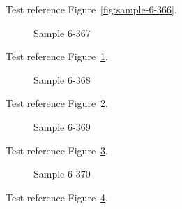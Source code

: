 Test reference Figure~\ref{fig:sample-6-366}.

\begin{figure}[tbhp]
\caption{Sample 6-367}
\label{fig:sample-6-367}
\end{figure}

Test reference Figure~\ref{fig:sample-6-367}.

\begin{figure}[tbhp]
\caption{Sample 6-368}
\label{fig:sample-6-368}
\end{figure}

Test reference Figure~\ref{fig:sample-6-368}.

\begin{figure}[tbhp]
\caption{Sample 6-369}
\label{fig:sample-6-369}
\end{figure}

Test reference Figure~\ref{fig:sample-6-369}.

\begin{figure}[tbhp]
\caption{Sample 6-370}
\label{fig:sample-6-370}
\end{figure}

Test reference Figure~\ref{fig:sample-6-370}.

